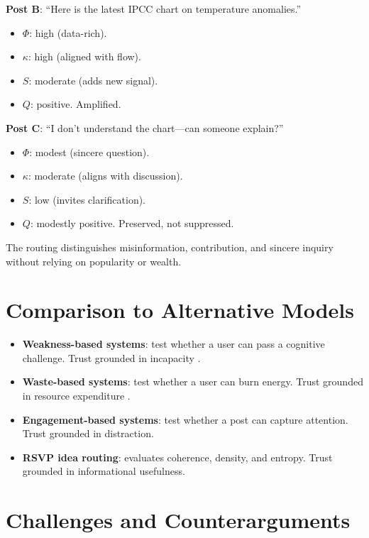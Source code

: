 \documentclass[openany]{book}
\begin{document}
\textbf{Post B}: ``Here is the latest IPCC chart on temperature anomalies.''

\begin{itemize}
    \item $\Phi$: high (data-rich).
    \item $\kappa$: high (aligned with flow).
    \item $S$: moderate (adds new signal).
    \item $Q$: positive. Amplified.
\end{itemize}

\textbf{Post C}: ``I don’t understand the chart---can someone explain?''

\begin{itemize}
    \item $\Phi$: modest (sincere question).
    \item $\kappa$: moderate (aligns with discussion).
    \item $S$: low (invites clarification).
    \item $Q$: modestly positive. Preserved, not suppressed.
\end{itemize}

The routing distinguishes misinformation, contribution, and sincere inquiry without relying on popularity or wealth.

\section{Comparison to Alternative Models}

\begin{itemize}
    \item \textbf{Weakness-based systems}: test whether a user can pass a cognitive challenge. Trust grounded in incapacity \cite{conitzer2020}.
    \item \textbf{Waste-based systems}: test whether a user can burn energy. Trust grounded in resource expenditure \cite{nakamoto2008}.
    \item \textbf{Engagement-based systems}: test whether a post can capture attention. Trust grounded in distraction.
    \item \textbf{RSVP idea routing}: evaluates coherence, density, and entropy. Trust grounded in informational usefulness.
\end{itemize}

\section{Challenges and Counterarguments}
\end{document}
